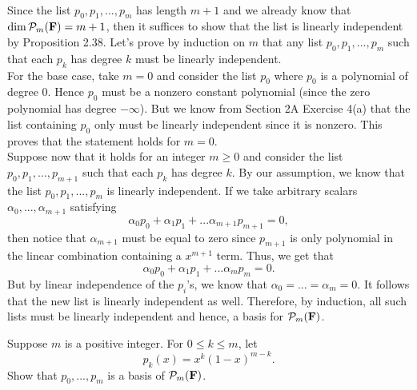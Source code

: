 \begin{solution}
    \\ Since the list $p_0,p_1, ..., p_m$ has length $m+1$ and we already know that $\dim \mathcal{P}_m(\mathbf{F}) = m+1$, then it suffices to show that the list is linearly independent by Proposition 2.38. Let's prove by induction on $m$ that any list $p_0, p_1, ..., p_m$ such that each $p_k$ has degree $k$ must be linearly independent. \\
    For the base case, take $m = 0$ and consider the list $p_0$ where $p_0$ is a polynomial of degree $0$. Hence $p_0$ must be a nonzero constant polynomial (since the zero polynomial has degree $-\infty$). But we know from Section 2A Exercise 4(a) that the list containing $p_0$ only must be linearly independent since it is nonzero. This proves that the statement holds for $m=0$. \\
    Suppose now that it holds for an integer $m \geq 0$ and consider the list $p_0, p_1, ..., p_{m+1}$ such that each $p_k$ has degree $k$. By our assumption, we know that the list $p_0, p_1, ..., p_m$ is linearly independent. If we take arbitrary scalars $\alpha_0, ..., \alpha_{m+1}$ satisfying
    $$\alpha_0 p_0 + \alpha_1 p_1 + ... \alpha_{m+1} p_{m+1} = 0,$$
    then notice that $\alpha_{m+1}$ must be equal to zero since $p_{m+1}$ is only polynomial in the linear combination containing a $x^{m+1}$ term. Thus, we get that
    $$\alpha_0 p_0 + \alpha_1 p_1 + ... \alpha_m p_m = 0.$$
    But by linear independence of the $p_i$'s, we know that $\alpha_0 = ... = \alpha_m = 0$. It follows that the new list is linearly independent as well. Therefore, by induction, all such lists must be linearly independent and hence, a basis for $\mathcal{P}_m(\mathbf{F})$.\\ 
\end{solution}

\begin{exercise}
    Suppose $m$ is a positive integer. For $0 \leq k \leq m$, let 
    $$p_k(x) = x^k(1-x)^{m-k}.$$
    Show that $p_0, ..., p_m$ is a basis of $\mathcal{P}_m(\mathbf{F})$.\\
\end{exercise}

